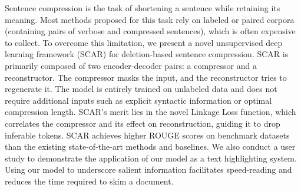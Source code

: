 Sentence compression is the task of shortening a sentence while retaining its meaning. Most methods proposed for this task rely on labeled or paired corpora (containing pairs of verbose and compressed sentences), which is often expensive to collect. To overcome this limitation, we present a novel unsupervised deep learning framework (SCAR) for deletion-based sentence compression. SCAR is primarily composed of two encoder-decoder pairs: a compressor and a reconstructor. The compressor masks the input, and the reconstructor tries to regenerate it. The model is entirely trained on unlabeled data and does not require additional inputs such as explicit syntactic information or optimal compression length. SCAR's merit lies in the novel Linkage Loss function, which correlates the compressor and its effect on reconstruction, guiding it to drop inferable tokens. SCAR achieves higher ROUGE scores on benchmark datasets than the existing state-of-the-art methods and baselines. We also conduct a user study to demonstrate the application of our model as a text highlighting system. Using our model to underscore salient information facilitates speed-reading and reduces the time required to skim a document.
